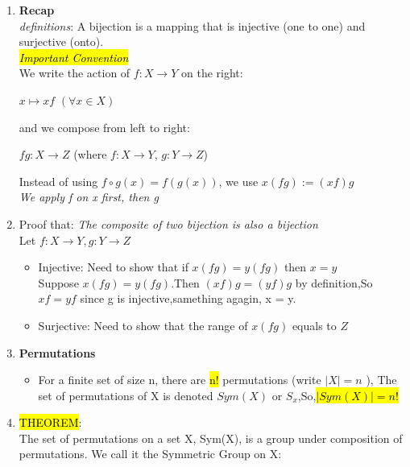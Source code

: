 \documentclass{article}
\begin{document}
\begin{enumerate}
    \item \textbf{Recap}\\
    \textit{definitions}: A bijection is a mapping that is injective (one to one) and surjective (onto). \\

    \hl{\textit{Important Convention}}\\
    We write the action of $f: X \rightarrow Y$ on the right:
    \begin{center}
        $x \mapsto xf$ $(\forall x \in X)$
    \end{center}
    and we compose from left to right:
    \begin{center}
        $fg: X \rightarrow Z$ (where $f:X \rightarrow Y$,
        $g:Y \rightarrow Z$)
    \end{center}
    Instead of using $f \circ g(x) = f(g(x))$, we use $x(fg) := (xf)g$\\
    \textit{We apply f on x first, then g}

    \item Proof that: \textit{The composite of two bijection is also a bijection}\\
    Let $f: X \rightarrow Y, g: Y \rightarrow Z$
    \begin{itemize}
        \item Injective: Need to show that if $x(fg)=y(fg)$ then $x=y$\\
        Suppose $x(fg)=y(fg)$.Then $(xf)g = (yf)g$ by definition,So $xf =yf$ since g is injective,samething agagin, x = y.\\

        \item Surjective: Need to show that the range of $x(fg)$ equals to $Z$
    \end{itemize} 


    \item \textbf{Permutations}
    \begin{itemize}
        \item For a finite set of size n, there are \hl{n!} permutations (write $|X|=n$ ), The set of permutations of X is denoted $Sym(X)$ or $S_x$,So,\hl{$|Sym(X)|=n!$}
    \end{itemize}

    \item \hl{THEOREM}: \\
    The set of permutations on a set X, Sym(X), is a group under composition of permutations. We call it the Symmetric Group on X:


\end{enumerate}
\end{document}
